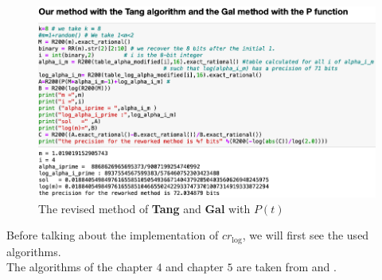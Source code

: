\begin{figure}[H]
    \centering
    \includegraphics[scale = 0.49]{images/notre_met_Tang_Gal/algo_remanie_avec_P.png}
    \caption{The revised method  of \textbf{Tang} and \textbf{Gal} with $P(t)$}\label{fig:P}
\end{figure}

Before talking about the implementation of $cr_{\log}$, we will first see 
the used algorithms.\\

The algorithms of the chapter $4$ and chapter $5$ are taken from \cite{daramy2009cr} and \cite{lauter2005basic}.